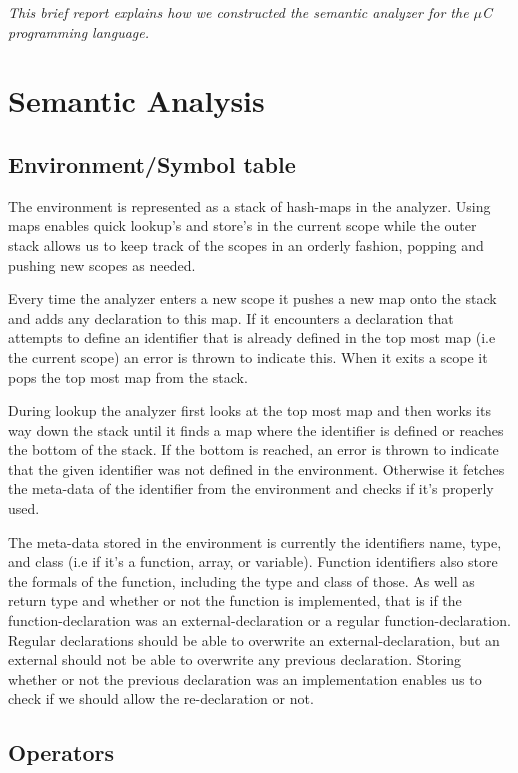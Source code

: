 \textit{This brief report explains how we constructed the semantic analyzer for the $\mu$C programming language.}

\section{Semantic Analysis}

\subsection{Environment/Symbol table}
The environment is represented as a stack of hash-maps in the analyzer. Using maps enables quick lookup's and store's in the current scope while the outer stack allows us to keep track of the scopes in an orderly fashion, popping and pushing new scopes as needed.

Every time the analyzer enters a new scope it pushes a new map onto the stack and adds any declaration to this map. If it encounters a declaration that attempts to define an identifier that is already defined in the top most map (i.e the current scope) an error is thrown to indicate this. When it exits a scope it pops the top most map from the stack.

During lookup the analyzer first looks at the top most map and then works its way down the stack until it finds a map where the identifier is defined or reaches the bottom of the stack. If the bottom is reached, an error is thrown to indicate that the given identifier was not defined in the environment. Otherwise it fetches the meta-data of the identifier from the environment and checks if it's properly used.

The meta-data stored in the environment is currently the identifiers name, type, and class (i.e if it's a function, array, or variable). Function identifiers also store the formals of the function, including the type and class of those. As well as return type and whether or not the function is implemented, that is if the function-declaration was an external-declaration or a regular function-declaration. Regular declarations should be able to overwrite an external-declaration, but an external should not be able to overwrite any previous declaration. Storing whether or not the previous declaration was an implementation enables us to check if we should allow the re-declaration or not.

\subsection{Operators}\label{operators}

